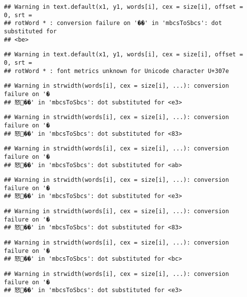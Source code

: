 \documentclass[]{article}
\begin{document}
\begin{verbatim}
## Warning in text.default(x1, y1, words[i], cex = size[i], offset = 0, srt =
## rotWord * : conversion failure on '��' in 'mbcsToSbcs': dot substituted for
## <be>
\end{verbatim}

\begin{verbatim}
## Warning in text.default(x1, y1, words[i], cex = size[i], offset = 0, srt =
## rotWord * : font metrics unknown for Unicode character U+307e
\end{verbatim}

\begin{verbatim}
## Warning in strwidth(words[i], cex = size[i], ...): conversion failure on '�
## 怒��' in 'mbcsToSbcs': dot substituted for <e3>
\end{verbatim}

\begin{verbatim}
## Warning in strwidth(words[i], cex = size[i], ...): conversion failure on '�
## 怒��' in 'mbcsToSbcs': dot substituted for <83>
\end{verbatim}

\begin{verbatim}
## Warning in strwidth(words[i], cex = size[i], ...): conversion failure on '�
## 怒��' in 'mbcsToSbcs': dot substituted for <ab>
\end{verbatim}

\begin{verbatim}
## Warning in strwidth(words[i], cex = size[i], ...): conversion failure on '�
## 怒��' in 'mbcsToSbcs': dot substituted for <e3>
\end{verbatim}

\begin{verbatim}
## Warning in strwidth(words[i], cex = size[i], ...): conversion failure on '�
## 怒��' in 'mbcsToSbcs': dot substituted for <83>
\end{verbatim}

\begin{verbatim}
## Warning in strwidth(words[i], cex = size[i], ...): conversion failure on '�
## 怒��' in 'mbcsToSbcs': dot substituted for <bc>
\end{verbatim}

\begin{verbatim}
## Warning in strwidth(words[i], cex = size[i], ...): conversion failure on '�
## 怒��' in 'mbcsToSbcs': dot substituted for <e3>
\end{verbatim}
\end{document}
